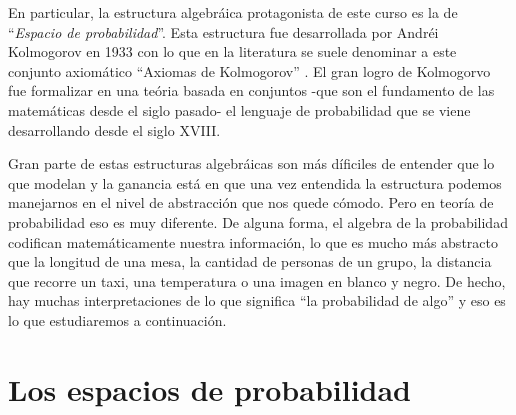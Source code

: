 En particular, la estructura algebráica protagonista de este curso es la de ``{\it Espacio de probabilidad}''. Esta estructura fue desarrollada por Andréi Kolmogorov en 1933 con lo que en la literatura se suele denominar a este conjunto axiomático ``Axiomas de Kolmogorov'' \cite{kolmogorov1933grundbegriffe,kolmogorov1956foundations}. El gran logro de Kolmogorvo fue formalizar en una teória basada en conjuntos -que son el fundamento de las matemáticas desde el siglo pasado- el lenguaje de probabilidad que se viene desarrollando desde el siglo XVIII.

Gran parte de estas estructuras algebráicas son más díficiles de entender que lo que modelan y la ganancia está en que una vez entendida la estructura podemos manejarnos en el nivel de abstracción que nos quede cómodo. Pero en teoría de probabilidad eso es muy diferente. De alguna forma, el algebra de la probabilidad codifican matemáticamente nuestra información, lo que es mucho más abstracto que la longitud de una mesa, la cantidad de personas de un grupo, la distancia que recorre un taxi, una temperatura o una imagen en blanco y negro. De hecho, hay muchas interpretaciones de lo que significa ``la probabilidad de algo'' y eso es lo que estudiaremos a continuación.

\section{Los espacios de probabilidad}


